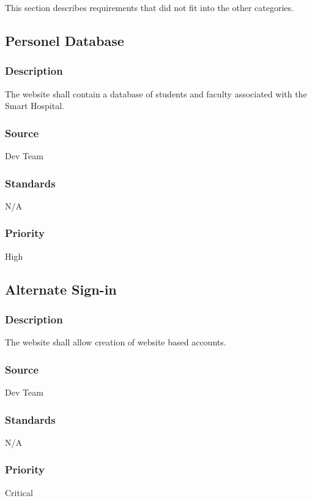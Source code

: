 This section describes requirements that did not fit into the other categories.


\subsection{Personel Database}
\subsubsection{Description}
The website shall contain a database of students and faculty associated with the Smart Hospital.
\subsubsection{Source}
Dev Team
\subsubsection{Standards}
N/A
\subsubsection{Priority}
High

\subsection{Alternate Sign-in}
\subsubsection{Description}
The website shall allow creation of website based accounts.
\subsubsection{Source}
Dev Team
\subsubsection{Standards}
N/A
\subsubsection{Priority}
Critical


